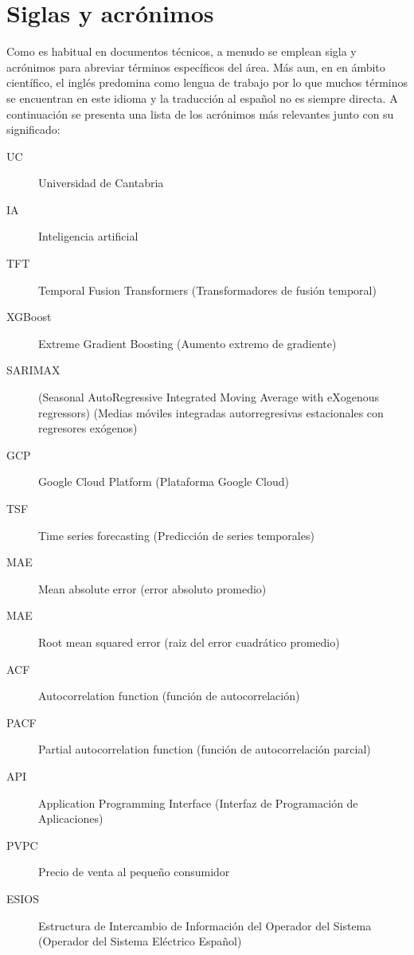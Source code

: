\clearpage
\hypersetup{linkcolor=black}
\tableofcontents\clearpage
\listoffigures\clearpage
\hypersetup{linkcolor=linkscolor}

\chapter*{Siglas y acrónimos}
%
%
Como es habitual en documentos técnicos, a menudo se emplean sigla y acrónimos para abreviar términos específicos del área. Más aun, en en ámbito científico, el inglés predomina como lengua de trabajo por lo que muchos términos se encuentran en este idioma y la traducción al español no es siempre directa. A continuación se presenta una lista de los acrónimos más relevantes junto con su significado:
%
%
\begin{description}
    \item[UC] Universidad de Cantabria
    \item[IA] Inteligencia artificial
    \item[TFT]  Temporal Fusion Transformers (Transformadores de fusión temporal)
    \item[XGBoost] Extreme Gradient Boosting (Aumento extremo de gradiente)
    \item[SARIMAX] (Seasonal AutoRegressive Integrated Moving Average with eXogenous regressors) (Medias móviles integradas autorregresivas estacionales con regresores exógenos)
    \item[GCP] Google Cloud Platform (Plataforma Google Cloud)
    \item[TSF] Time series forecasting (Predicción de series temporales)
    \item[MAE] Mean absolute error (error absoluto promedio)
    \item[MAE] Root mean squared error (raiz del error cuadrático promedio)
    \item[ACF] Autocorrelation function (función de autocorrelación)
    \item[PACF] Partial autocorrelation function (función de autocorrelación parcial)
    \item[API] Application Programming Interface (Interfaz de Programación de Aplicaciones)
    \item[PVPC] Precio de venta al pequeño consumidor 
    \item[ESIOS] Estructura de Intercambio de Información del Operador del Sistema (Operador del Sistema Eléctrico Español)  
\end{description}

